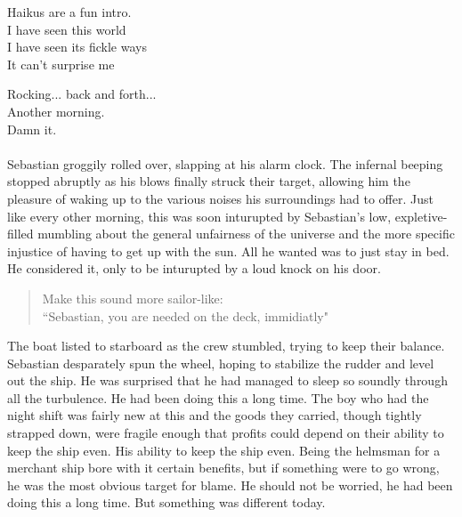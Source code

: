 Haikus are a fun intro. \\
I have seen this world \\
I have seen its fickle ways \\
It can't surprise me 
\pagebreak

Rocking... back and forth... \\
Another morning. \\
Damn it. \\\\
Sebastian groggily rolled over, slapping at his alarm clock. The infernal 
beeping stopped abruptly as his blows finally struck their target, allowing him
the pleasure of waking up to the various noises his surroundings had to offer.
Just like every other morning, this was soon inturupted
by Sebastian’s low, expletive-filled mumbling about the 
general unfairness of the universe and the more specific injustice of 
having to get up with the sun. All he wanted was to just stay in bed. 
He considered it, only to be inturupted by a loud knock on his
door. 

\begin{quote} 
\A Make this sound more sailor-like: \E \\
``Sebastian, you are needed on the deck, immidiatly"
\end{quote}
       
The boat listed to starboard as the crew stumbled, trying to keep their balance.
Sebastian desparately spun the wheel, hoping to stabilize the rudder and level
out the ship. He was surprised that he had managed to sleep so soundly through
all the turbulence. He had been doing this a long time. The boy who had the
night shift was fairly new at this and the goods they carried, though tightly
strapped down, were fragile enough that profits could depend on their
ability to keep the ship even. His ability to keep the ship even. 
Being the helmsman for a merchant ship bore with it certain benefits, but if
something were to go wrong, he was the most obvious target for blame. He should
not be worried, he had been doing this a long time. But something was different
today. \\

